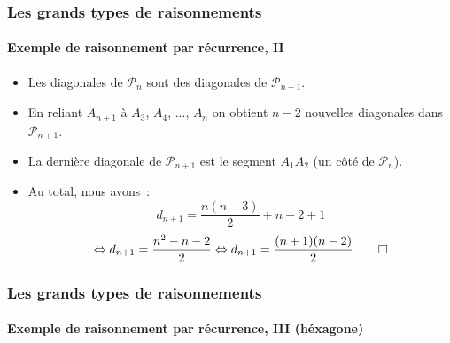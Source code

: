 \documentclass[10pt,notheorems]{beamer}
\theoremstyle{plain}
\theoremstyle{definition} %
\begin{document}
\begin{frame}
  \frametitle{Les grands types de raisonnements}
  \framesubtitle{Exemple de raisonnement par récurrence, II}
  \hypertarget{slide_raisonnement_par_reccurence_2}{}

  \bigskip

  \begin{itemize}

  \item Les diagonales de $\mathcal P_n$ sont des diagonales de $\mathcal P_{n+1}$.\newline
  \item En reliant $A_{n+1}$ à $A_3$, $A_4$, ..., $A_n$ on obtient $n-2$ nouvelles diagonales dans $\mathcal P_{n+1}$.\newline
  \item La dernière diagonale de $\mathcal P_{n+1}$ est le segment $A_1A_2$ (un côté de $\mathcal P_n$).\newline
  \item Au total, nous avons~:
    \[
      d_{n+1} = \frac{n(n-3)}{2} + n-2 + 1
    \]
    \[
      \Leftrightarrow d_{n+1} = \frac{n^2-n-2}{2} \Leftrightarrow d_{n+1} = \frac{(n+1)(n-2)}{2} \qed
    \]
  \end{itemize}

\end{frame}


\begin{frame}
  \frametitle{Les grands types de raisonnements}
  \framesubtitle{Exemple de raisonnement par récurrence, III (héxagone)}
  \hypertarget{slide_raisonnement_par_reccurence_3}{}

  \begin{center}
  \end{center}

\end{frame}
\end{document}
